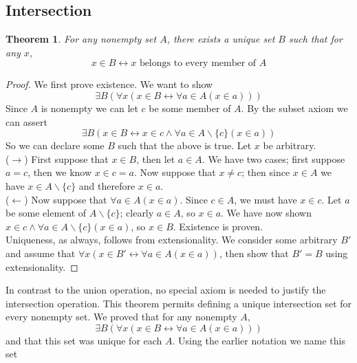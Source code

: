 \documentclass{report}
\newtheorem{theorem}[theo]{Theorem}
\begin{document}
\subsection{Intersection}
\begin{theorem}
For any nonempty set $A$, there exists a unique set $B$ such that for any $x$, 
\begin{equation*}
x\in B\leftrightarrow x\text{ belongs to every member of $A$}
\end{equation*}
\end{theorem}
\begin{proof}
We first prove existence. We want to show
\begin{equation*}
\exists B(\forall x(x\in B\leftrightarrow\forall a\in A(x\in a)))
\end{equation*}
Since $A$ is nonempty we can let $c$ be some member of $A$. By the subset axiom we can assert 
\begin{equation*}
\exists B(x\in B\leftrightarrow x\in c\land \forall a\in A\backslash\{c\}(x\in a))
\end{equation*}
So we can declare some $B$ such that the above is true. Let $x$ be arbitrary.\\ 
\indent($\rightarrow$) First suppose that $x\in B$, then let $a\in A$. 
We have two cases; first suppose $a=c$, then we know $x\in c=a$. Now suppose that $x\neq c$; then since $x\in A$ we have $x\in A\backslash\{c\}$ and therefore $x\in a$.\\
\indent($\leftarrow$) Now suppose that $\forall a\in A(x\in a)$. Since $c\in A$, we must have $x\in c$. Let $a$ be some element of $A\backslash\{c\}$; clearly $a\in A$, so $x\in a$. We have 
now shown $x\in c\land \forall a\in A\backslash\{c\}(x\in a)$, so $x\in B$. Existence is proven.\\
\indent Uniqueness, as always, follows from extensionality. We consider some arbitrary $B'$ and assume that $\forall x(x\in B'\leftrightarrow\forall a\in A(x\in a))$, then show that $B'=B$ using
extensionality.
\end{proof}
\noindent In contrast to the union operation, no special axiom is needed to justify the intersection operation. This theorem permits defining a unique intersection set for every nonempty set.
We proved that for any nonempty $A$,
\begin{equation*}
\exists B(\forall x(x\in B\leftrightarrow\forall a\in A(x\in a)))
\end{equation*}
and that this set was unique for each $A$. Using the earlier notation we name this set
\end{document}
